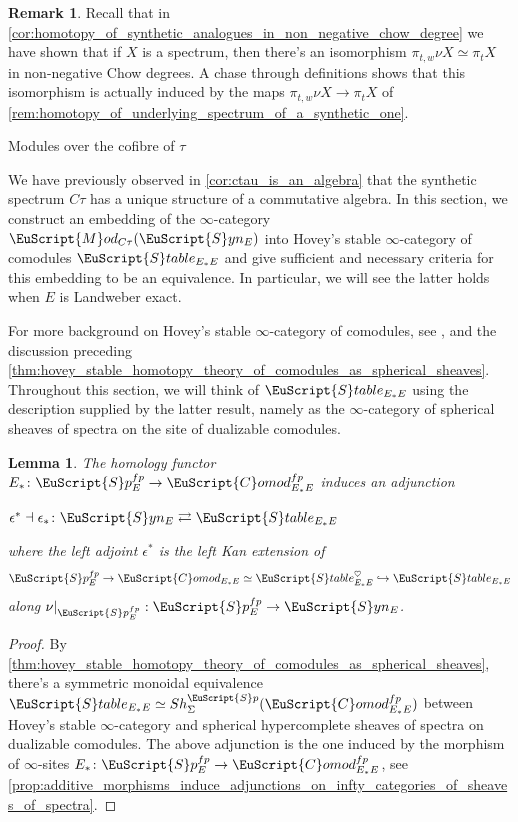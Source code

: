 \documentclass[oneside,a4paper]{amsart}
\makeatletter
\newcommand{\euscr}[1]{\EuScript{#1}} %
\newcommand{\spectra}{\euscr{S}p} %
\newcommand{\stableE}{\euscr{S}table_{E_{*}E}} %
\newcommand{\synspectra}{\euscr{S}yn} %
\newcommand{\spectrafp}{\spectra_{E}^{fp}} %
\newcommand{\Comod}{\euscr{C}omod} %
\newcommand{\ComodE}{\Comod_{E_{*}E}} %
\newcommand{\Mod}{\euscr{M}od} %
\theoremstyle{plain}
\newtheorem{lemma}[thm]{Lemma}
\theoremstyle{definition}
\newtheorem{rem}[thm]{Remark}
\theoremstyle{remark}
\def\subsection{\@startsection{subsection}{1}%
  \z@{.7\linespacing\@plus\linespacing}{.5\linespacing}%
  {\normalfont\bfseries\centering}}%
\makeatother
\begin{document}
\begin{rem}
Recall that in \cref{cor:homotopy_of_synthetic_analogues_in_non_negative_chow_degree} we have shown that if $X$ is a spectrum, then there's an isomorphism $\pi_{t, w} \nu X \simeq \pi_{t} X$ in non-negative Chow degrees. A chase through definitions shows that this isomorphism is actually induced by the maps $\pi_{t, w} \nu X \rightarrow \pi_{t} X$ of \cref{rem:homotopy_of_underlying_spectrum_of_a_synthetic_one}. 
\end{rem}

\subsection{Modules over the cofibre of $\tau$}

We have previously observed in \cref{cor:ctau_is_an_algebra} that the synthetic spectrum $C\tau$ has a unique structure of a commutative algebra. In this section, we construct an embedding of the $\infty$-category $\Mod_{C\tau}(\synspectra_{E})$ into Hovey's stable $\infty$-category of comodules $\stableE$ and give sufficient and necessary criteria for this embedding to be an equivalence. In particular, we will see the latter holds when $E$ is Landweber exact.

For more background on Hovey's stable $\infty$-category of comodules, see \cite{hovey2003homotopy}, \cite{barthel2015local} and the discussion preceding \cref{thm:hovey_stable_homotopy_theory_of_comodules_as_spherical_sheaves}. Throughout this section, we will think of $\stableE$ using the description supplied by the latter result, namely as the $\infty$-category of spherical sheaves of spectra on the site of dualizable comodules. 

\begin{lemma}
\label{lemma:there_exists_an_adjunction_between_synthetic_spectra_and_stable_category_of_comodules}
The homology functor $E_{*} \colon \spectrafp \rightarrow \ComodE^{fp}$ induces an adjunction 

\begin{center}
$\epsilon^{*} \dashv \epsilon_{*} \colon \synspectra_{E} \rightleftarrows \stableE$
\end{center}
where the left adjoint $\epsilon^{*}$ is the left Kan extension of
\[
\spectrafp \rightarrow \ComodE \simeq \stableE^{\heartsuit} \hookrightarrow \stableE
\]
along $\nu |_{\spectrafp}: \spectrafp \rightarrow \synspectra_{E}$.
\end{lemma}

\begin{proof}
By \cref{thm:hovey_stable_homotopy_theory_of_comodules_as_spherical_sheaves}, there's a symmetric monoidal equivalence $\stableE \simeq Sh_{\Sigma}^{\spectra}(\ComodE^{fp})$ between Hovey's stable $\infty$-category and spherical hypercomplete sheaves of spectra on dualizable comodules. The above adjunction is the one induced by the morphism of $\infty$-sites $E_{*} \colon \spectrafp \rightarrow \ComodE^{fp}$, see \cref{prop:additive_morphisms_induce_adjunctions_on_infty_categories_of_sheaves_of_spectra}.
\end{proof}
\end{document}
